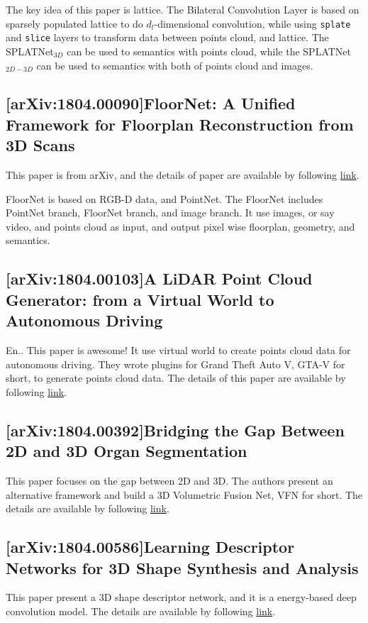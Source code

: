 The key idea of this paper is lattice. The Bilateral Convolution Layer is based
on sparsely populated lattice to do $d_l$-dimensional convolution, while using
\verb|splate| and \verb|slice| layers to transform data between points cloud,
and lattice. The SPLATNet$_{3D}$ can be used to semantics with points cloud,
while the SPLATNet$_{2D-3D}$ can be used to semantics with both of points cloud
and images.

\subsection{[arXiv:1804.00090]FloorNet: A Unified Framework for Floorplan
  Reconstruction from 3D Scans}

This paper is from arXiv, and the details of paper are available by following
\href{https://arxiv.org/abs/1804.00090}{link}.

FloorNet is based on RGB-D data, and PointNet. The FloorNet includes PointNet
branch, FloorNet branch, and image branch. It use images, or say video, and
points cloud as input, and output pixel wise floorplan, geometry, and semantics.

\subsection{[arXiv:1804.00103]A LiDAR Point Cloud Generator: from a Virtual
  World to Autonomous Driving}

En.. This paper is awesome! It use virtual world to create points cloud data for
autonomous driving. They wrote plugins for Grand Theft Auto V, GTA-V for short,
to generate points cloud data. The details of this paper are available by
following \href{https://arxiv.org/abs/1804.00103}{link}.

\subsection{[arXiv:1804.00392]Bridging the Gap Between 2D and 3D Organ Segmentation}

This paper focuses on the gap between 2D and 3D. The authors present an
alternative framework and build a 3D Volumetric Fusion Net, VFN for short.
The details are available by following
\href{https://arxiv.org/abs/1804.00392}{link}.

\subsection{[arXiv:1804.00586]Learning Descriptor Networks for 3D Shape
  Synthesis and Analysis}
This paper present a 3D shape descriptor network, and it is a energy-based deep
convolution model. The details are available by following
\href{https://arxiv.org/abs/1804.00586}{link}.

